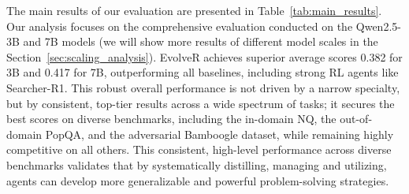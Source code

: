 The main results of our evaluation are presented in Table~\ref{tab:main_results}. Our analysis focuses on the comprehensive evaluation conducted on the Qwen2.5-3B and 7B models (we will show more results of different model scales in the Section~\ref{sec:scaling_analysis}). EvolveR achieves superior average scores 0.382 for 3B and 0.417 for 7B, outperforming all baselines, including strong RL agents like Searcher-R1. This robust overall performance is not driven by a narrow specialty, but by consistent, top-tier results across a wide spectrum of tasks; it secures the best scores on diverse benchmarks, including the in-domain NQ, the out-of-domain PopQA, and the adversarial Bamboogle dataset, while remaining highly competitive on all others. 
This consistent, high-level performance across diverse benchmarks validates that by systematically distilling, managing and utilizing, agents can develop more generalizable and powerful problem-solving strategies.




